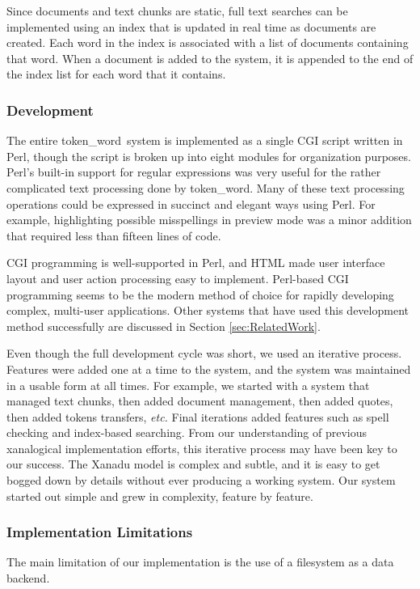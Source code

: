 \documentclass{acm_proc_article-sp}
\newcommand{\tw}{token\_word}
\begin{document}
Since documents and text chunks are static, full text searches can be implemented using an index that is updated in real time as documents are created.
Each word in the index is associated with a list of documents containing that word.
When a document is added to the system, it is appended to the end of the index list for each word that it contains.


\subsubsection{Development}
The entire \tw \  system is implemented as a single CGI script written in Perl, though the script is broken up into eight modules for organization purposes.
Perl's built-in support for regular expressions was very useful for the rather complicated text processing done by \tw.
Many of these text processing operations could be expressed in succinct and elegant ways using Perl.
For example, highlighting possible misspellings in preview mode was a minor addition that required less than fifteen lines of code.

CGI programming is well-supported in Perl, and HTML made user interface layout and user action processing easy to implement.
Perl-based CGI programming seems to be the modern method of choice for rapidly developing complex, multi-user applications.
Other systems that have used this development method successfully are discussed in Section \ref{sec:RelatedWork}.

Even though the full development cycle was short, we used an iterative process.
Features were added one at a time to the system, and the system was maintained in a usable form at all times.
For example, we started with a system that managed text chunks, then added document management, then added quotes, then added tokens transfers, {\it etc.}
Final iterations added features such as spell checking and index-based searching.
From our understanding of previous xanalogical implementation efforts, this iterative process may have been key to our success.
The Xanadu model is complex and subtle, and it is easy to get bogged down by details without ever producing a working system.
Our system started out simple and grew in complexity, feature by feature.


\subsubsection{Implementation Limitations}
The main limitation of our implementation is the use of a filesystem as a data backend.
\end{document}
